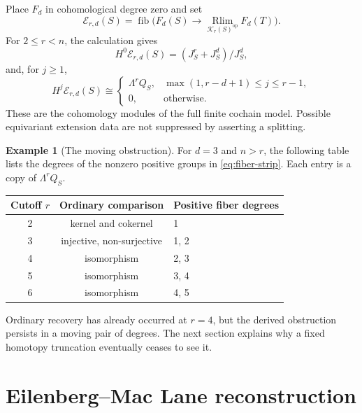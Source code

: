\documentclass[11pt,a4paper]{article}
\theoremstyle{definition}
\newtheorem{example}[theorem]{Example}
\theoremstyle{remark}
\newcommand{\Kpos}{\mathcal K_r(S)}
\newcommand{\op}{\mathrm{op}}
\newcommand{\Rlim}{\operatorname*{Rlim}}
\DeclareMathOperator{\fib}{fib}
\begin{document}
Place $F_d$ in cohomological degree zero and set
\[
 \mathcal E_{r,d}(S)=\fib\bigl(F_d(S)\to\Rlim_{\Kpos^{\op}}F_d(T)\bigr).
\]
For $2\le r<n$, the calculation gives
\[
 H^0\mathcal E_{r,d}(S)=(J_S^r+J_S^d)/J_S^d,
\]
and, for $j\ge1$,
\begin{equation}\label{eq:fiber-strip}
 H^j\mathcal E_{r,d}(S)\cong
 \begin{cases}\Lambda^rQ_S,&\max(1,r-d+1)\le j\le r-1,\\0,&\text{otherwise}.
 \end{cases}
\end{equation}
These are the cohomology modules of the full finite cochain model. Possible equivariant extension data are not suppressed by asserting a splitting.

\begin{example}[The moving obstruction]\label{ex:moving}
For $d=3$ and $n>r$, the following table lists the degrees of the nonzero positive groups in \eqref{eq:fiber-strip}. Each entry is a copy of $\Lambda^rQ_S$.
\begin{center}
\begin{tabular}{@{}ccl@{}}
\toprule
Cutoff $r$ & Ordinary comparison & Positive fiber degrees\\
\midrule
2 & kernel and cokernel & 1\\
3 & injective, non-surjective & 1, 2\\
4 & isomorphism & 2, 3\\
5 & isomorphism & 3, 4\\
6 & isomorphism & 4, 5\\
\bottomrule
\end{tabular}
\end{center}
Ordinary recovery has already occurred at $r=4$, but the derived obstruction persists in a moving pair of degrees. The next section explains why a fixed homotopy truncation eventually ceases to see it.
\end{example}

\section{Eilenberg--Mac Lane reconstruction}
\end{document}
